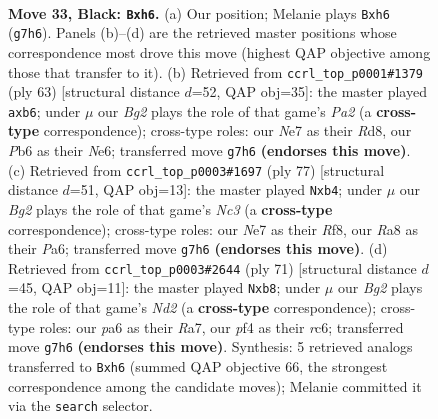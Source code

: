 \documentclass[11pt]{article}
\begin{document}
\clearpage

\begin{figure}[p]\centering
\begin{subfigure}{0.46\textwidth}\centering
\resizebox{\linewidth}{!}{%
\newchessgame
\chessboard[
  setfen={r5k1/p3n1b1/Pp5R/5p2/4pP2/8/4B3/1RB1K3 b - - 0 33},
  showmover=false,
  pgfstyle=straightmove, color=movearrow, markmove={g7-h6}
]}
\caption{}
\end{subfigure}\hfill
\begin{subfigure}{0.46\textwidth}\centering
\resizebox{\linewidth}{!}{%
\newchessgame
\chessboard[
  setfen={3r2k1/p4p1p/1R2n1p1/2b1B3/4R3/3B4/P1P2PP1/5K2 b - - 0 32},
  showmover=false,
  pgfstyle=straightmove, color=movearrow, markmove={a7-b6}
]}
\caption{}
\end{subfigure}
\\[4pt]
\begin{subfigure}{0.46\textwidth}\centering
\resizebox{\linewidth}{!}{%
\newchessgame
\chessboard[
  setfen={5rk1/1p6/p1n2pBp/P6P/1R6/2R5/5P2/6K1 b - - 0 39},
  showmover=false,
  pgfstyle=straightmove, color=movearrow, markmove={c6-b4}
]}
\caption{}
\end{subfigure}\hfill
\begin{subfigure}{0.46\textwidth}\centering
\resizebox{\linewidth}{!}{%
\newchessgame
\chessboard[
  setfen={1R6/r2n1p2/2R3pp/4p1k1/8/1B3P2/PP3K1P/8 b - - 0 36},
  showmover=false,
  pgfstyle=straightmove, color=movearrow, markmove={d7-b8}
]}
\caption{}
\end{subfigure}
\caption{\textbf{Move 33, Black: \texttt{Bxh6}.} (a) Our position; Melanie plays \texttt{Bxh6} (\texttt{g7h6}). Panels (b)--(d) are the retrieved master positions whose correspondence most drove this move (highest QAP objective among those that transfer to it). (b) Retrieved from \texttt{ccrl\_top\_p0001\#1379} (ply 63) [structural distance $d$=52, QAP obj=35]: the master played \texttt{axb6}; under $\mu$ our \emph{Bg2} plays the role of that game's \emph{Pa2} (a \textbf{cross-type} correspondence); cross-type roles: our \emph{N}e7 as their \emph{R}d8, our \emph{P}b6 as their \emph{N}e6; transferred move \texttt{g7h6} \textbf{(endorses this move)}. (c) Retrieved from \texttt{ccrl\_top\_p0003\#1697} (ply 77) [structural distance $d$=51, QAP obj=13]: the master played \texttt{Nxb4}; under $\mu$ our \emph{Bg2} plays the role of that game's \emph{Nc3} (a \textbf{cross-type} correspondence); cross-type roles: our \emph{N}e7 as their \emph{R}f8, our \emph{R}a8 as their \emph{P}a6; transferred move \texttt{g7h6} \textbf{(endorses this move)}. (d) Retrieved from \texttt{ccrl\_top\_p0003\#2644} (ply 71) [structural distance $d$=45, QAP obj=11]: the master played \texttt{Nxb8}; under $\mu$ our \emph{Bg2} plays the role of that game's \emph{Nd2} (a \textbf{cross-type} correspondence); cross-type roles: our \emph{p}a6 as their \emph{R}a7, our \emph{p}f4 as their \emph{r}c6; transferred move \texttt{g7h6} \textbf{(endorses this move)}. Synthesis: 5 retrieved analogs transferred to \texttt{Bxh6} (summed QAP objective 66, the strongest correspondence among the candidate moves); Melanie committed it via the \texttt{search} selector.}
\label{fig:thought-m65}
\end{figure}
\end{document}
